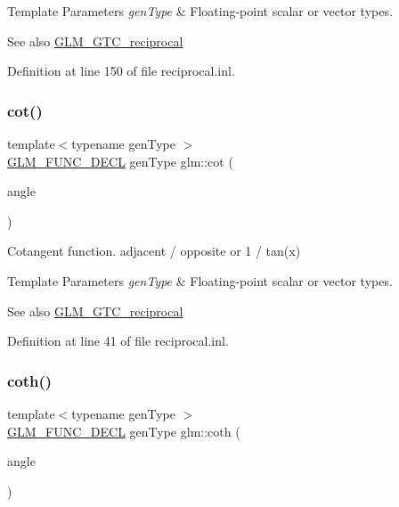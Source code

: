 \begin{DoxyTemplParams}{Template Parameters}
{\em gen\+Type} & Floating-\/point scalar or vector types.\\
\hline
\end{DoxyTemplParams}
\begin{DoxySeeAlso}{See also}
\mbox{\hyperlink{group__gtc__reciprocal}{G\+L\+M\+\_\+\+G\+T\+C\+\_\+reciprocal}} 
\end{DoxySeeAlso}


Definition at line 150 of file reciprocal.\+inl.

\mbox{\label{group__gtc__reciprocal_ga3a7b517a95bbd3ad74da3aea87a66314}} 
\subsubsection{\texorpdfstring{cot()}{cot()}}
{\footnotesize\ttfamily template$<$typename gen\+Type $>$ \\
\mbox{\hyperlink{setup_8hpp_ab2d052de21a70539923e9bcbf6e83a51}{G\+L\+M\+\_\+\+F\+U\+N\+C\+\_\+\+D\+E\+CL}} gen\+Type glm\+::cot (\begin{DoxyParamCaption}\item[{gen\+Type}]{angle }\end{DoxyParamCaption})}

Cotangent function. adjacent / opposite or 1 / tan(x)


\begin{DoxyTemplParams}{Template Parameters}
{\em gen\+Type} & Floating-\/point scalar or vector types.\\
\hline
\end{DoxyTemplParams}
\begin{DoxySeeAlso}{See also}
\mbox{\hyperlink{group__gtc__reciprocal}{G\+L\+M\+\_\+\+G\+T\+C\+\_\+reciprocal}} 
\end{DoxySeeAlso}


Definition at line 41 of file reciprocal.\+inl.

\mbox{\label{group__gtc__reciprocal_ga6b8b770eb7198e4dea59d52e6db81442}} 
\subsubsection{\texorpdfstring{coth()}{coth()}}
{\footnotesize\ttfamily template$<$typename gen\+Type $>$ \\
\mbox{\hyperlink{setup_8hpp_ab2d052de21a70539923e9bcbf6e83a51}{G\+L\+M\+\_\+\+F\+U\+N\+C\+\_\+\+D\+E\+CL}} gen\+Type glm\+::coth (\begin{DoxyParamCaption}\item[{gen\+Type}]{angle }\end{DoxyParamCaption})}

